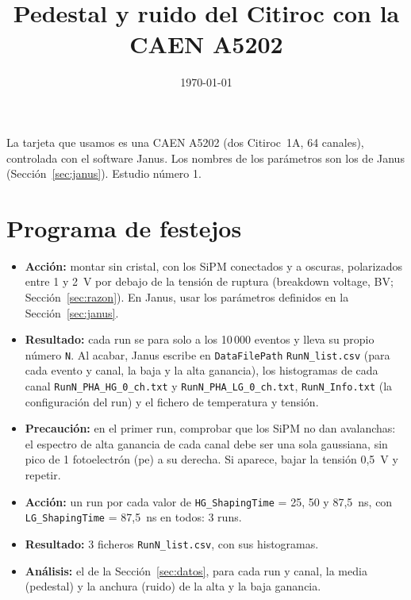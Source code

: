 \documentclass[11pt,a4paper]{article}
\title{Pedestal y ruido del Citiroc con la CAEN A5202}
\author{}
\date{\today}
\begin{document}
\maketitle

\noindent La tarjeta que usamos es una CAEN A5202 (dos Citiroc~1A, 64 canales),
controlada con el software Janus. Los nombres de los parámetros son los de
Janus (Sección~\ref{sec:janus}). Estudio número 1.

\section*{Programa de festejos}

\begin{itemize}
\item {\bf Acción:} montar sin cristal, con los  SiPM conectados y a oscuras, polarizados entre 1 y 2~V por
  debajo de la tensión de ruptura (breakdown voltage, BV;
  Sección~\ref{sec:razon}). En Janus,
  usar los parámetros definidos en la Sección~\ref{sec:janus}.
\item {\bf Resultado:} cada run se para solo a los 10\,000 eventos y lleva su
  propio número \texttt{N}. Al acabar, Janus escribe en \texttt{DataFilePath}
  \texttt{RunN\_list.csv} (para cada evento y canal, la baja y la alta
  ganancia), los histogramas de cada canal \texttt{RunN\_PHA\_HG\_0\_ch.txt}
  y \texttt{RunN\_PHA\_LG\_0\_ch.txt}, \texttt{RunN\_Info.txt} (la
  configuración del run) y el fichero de temperatura y tensión.
\item {\bf Precaución:} en el primer run, comprobar que los SiPM no dan avalanchas: el espectro de
  alta ganancia de cada canal debe ser una sola gaussiana, sin pico de
  1 fotoelectrón (pe) a su derecha. Si aparece, bajar la tensión 0,5~V y
  repetir.
\end{itemize}

\begin{itemize}
\item {\bf Acción:} un run por cada valor de \texttt{HG\_ShapingTime} =
  25, 50 y 87,5~ns, con \texttt{LG\_ShapingTime} = 87,5~ns en todos:
  3 runs.
\item {\bf Resultado:} 3 ficheros \texttt{RunN\_list.csv}, con sus
  histogramas.
\item {\bf Análisis:} el de la Sección~\ref{sec:datos}, para cada run
  y canal, la media (pedestal) y la anchura (ruido) de la alta y la baja
  ganancia.
\end{itemize}
\end{document}
